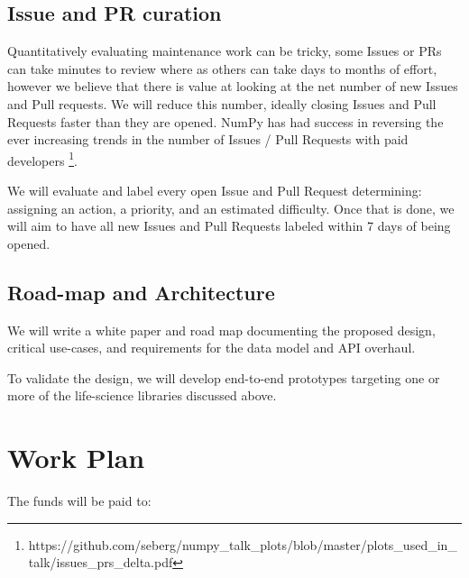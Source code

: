 \documentclass[11pt]{article}  %
\begin{document}
\subsection{Issue and PR curation}

Quantitatively evaluating maintenance work can be tricky, some Issues
or PRs can take minutes to review where as others can take days to
months of effort, however we believe that there is value at looking at
the net number of new Issues and Pull requests.  We will reduce this
number, ideally closing Issues and Pull Requests faster than they are
opened.  NumPy has had success in reversing the ever increasing trends
in the number of Issues / Pull Requests with paid
developers \footnote{https://github.com/seberg/numpy\_talk\_plots/blob/master/plots\_used\_in\_talk/issues\_prs\_delta.pdf}.


We will evaluate and label every open Issue and Pull Request
determining: assigning an action, a priority, and an estimated
difficulty.  Once that is done, we will aim to have all new Issues and
Pull Requests labeled within 7 days of being opened.


\subsection{Road-map and Architecture}

We will write a white paper and road map documenting the proposed
design, critical use-cases, and requirements for the data model and
API overhaul.

To validate the design, we will develop end-to-end prototypes
targeting one or more of the life-science libraries discussed above.



\section{Work Plan}

The funds will be paid to:
\end{document}
